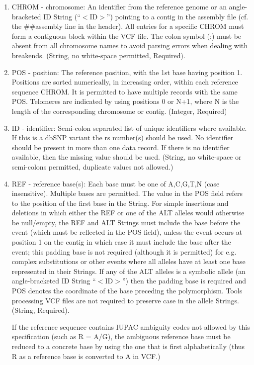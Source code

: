 \documentclass[8pt]{article}
\begin{document}
\begin{enumerate}
  \item CHROM - chromosome: An identifier from the reference genome or an angle-bracketed ID String (``$<$ID$>$'') pointing to a contig in the assembly file (cf. the \#\#assembly line in the header). All entries for a specific CHROM must form a contiguous block within the VCF file. The colon symbol (:) must be absent from all chromosome names to avoid parsing errors when dealing with breakends. (String, no white-space permitted, Required).
  \item POS - position: The reference position, with the 1st base having position 1. Positions are sorted numerically, in increasing order, within each reference sequence CHROM.   It is permitted to have multiple records with the same POS. Telomeres are indicated by using positions 0 or N+1, where N is the length of the corresponding chromosome or contig.   (Integer, Required)
  \item ID - identifier: Semi-colon separated list of unique identifiers where available. If this is a dbSNP variant the rs number(s) should be used. No identifier should be present in more than one data record. If there is no identifier available, then the missing value should be used. (String, no white-space or semi-colons permitted, duplicate values not allowed.)
  \item REF - reference base(s): Each base must be one of A,C,G,T,N (case
  insensitive). Multiple bases are permitted. The value in the POS field refers
  to the position of the first base in the String. For simple insertions and
  deletions in which either the REF or one of the ALT alleles would otherwise
  be null/empty, the REF and ALT Strings must include the base before the event
  (which must be reflected in the POS field), unless the event occurs at
  position 1 on the contig in which case it must include the base after the
  event; this padding base is not required (although it is permitted) for e.g.
  complex substitutions or other events where all alleles have at least one
  base represented in their Strings.  If any of the ALT alleles is a symbolic
  allele (an angle-bracketed ID String ``$<$ID$>$'') then the padding base is
  required and POS denotes the coordinate of the base preceding the
  polymorphism. Tools processing VCF files are not required to preserve case in
  the allele Strings. (String, Required).

  If the reference sequence contains IUPAC ambiguity codes not
  allowed by this specification (such as R = A/G), the ambiguous reference base 
  must be reduced to a concrete base by using the one that is first alphabetically
  (thus R as a reference base is converted to A in VCF.)



\end{enumerate}
\end{document}
